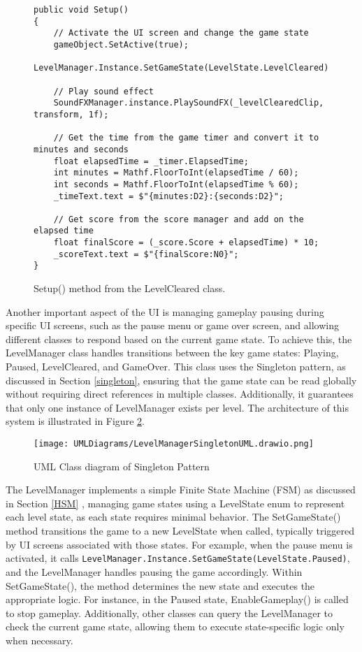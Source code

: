 \documentclass[10pt]{final_report}
\begin{document}
\begin{figure}[H]
\begin{verbatim}
public void Setup()
{
    // Activate the UI screen and change the game state
    gameObject.SetActive(true);
    LevelManager.Instance.SetGameState(LevelState.LevelCleared);

    // Play sound effect
    SoundFXManager.instance.PlaySoundFX(_levelClearedClip, transform, 1f);

    // Get the time from the game timer and convert it to minutes and seconds
    float elapsedTime = _timer.ElapsedTime;
    int minutes = Mathf.FloorToInt(elapsedTime / 60);
    int seconds = Mathf.FloorToInt(elapsedTime % 60);
    _timeText.text = $"{minutes:D2}:{seconds:D2}";

    // Get score from the score manager and add on the elapsed time
    float finalScore = (_score.Score + elapsedTime) * 10;
    _scoreText.text = $"{finalScore:N0}";
}
\end{verbatim}
\caption{Setup() method from the LevelCleared class.}
\label{setup}
\end{figure}

Another important aspect of the UI is managing gameplay pausing during specific UI screens, such as the pause menu or game over screen, and allowing different classes to respond based on the current game state. To achieve this, the LevelManager class handles transitions between the key game states: Playing, Paused, LevelCleared, and GameOver.
This class uses the Singleton pattern, as discussed in Section \ref{singleton}, ensuring that the game state can be read globally without requiring direct references in multiple classes. Additionally, it guarantees that only one instance of LevelManager exists per level. The architecture of this system is illustrated in Figure \ref{fig:label_singletonLevelManager}.

\begin{figure}[H]
    \centering
    \texttt{[image: UMLDiagrams/LevelManagerSingletonUML.drawio.png]}
    \caption{UML Class diagram of Singleton Pattern}
    \label{fig:label_singletonLevelManager}
\end{figure}

The LevelManager implements a simple Finite State Machine (FSM) as discussed in Section \ref{HSM} , managing game states using a LevelState enum to represent each level state, as each state requires minimal behavior. The SetGameState() method transitions the game to a new LevelState when called, typically triggered by UI screens associated with those states. For example, when the pause menu is activated, it calls \newline \texttt{LevelManager.Instance.SetGameState(LevelState.Paused)}, and the LevelManager handles pausing the game accordingly. Within SetGameState(), the method determines the new state and executes the appropriate logic. For instance, in the Paused state, EnableGameplay() is called to stop gameplay. Additionally, other classes can query the LevelManager to check the current game state, allowing them to execute state-specific logic only when necessary.\newline
\end{document}
